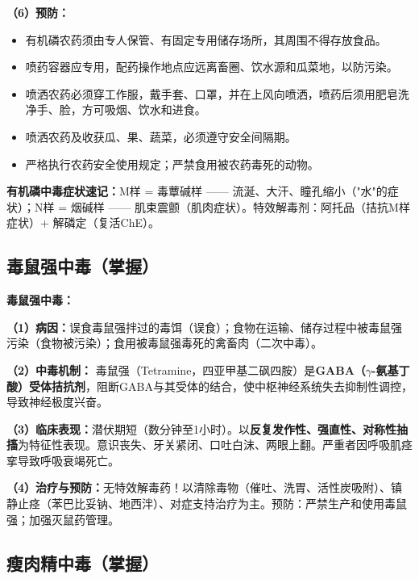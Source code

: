 \begin{keybox}
\textbf{（6）预防：}
\begin{itemize}[leftmargin=*]
    \item 有机磷农药须由专人保管、有固定专用储存场所，其周围不得存放食品。
    \item 喷药容器应专用，配药操作地点应远离畜圈、饮水源和瓜菜地，以防污染。
    \item 喷洒农药必须穿工作服，戴手套、口罩，并在上风向喷洒，喷药后须用肥皂洗净手、脸，方可吸烟、饮水和进食。
    \item 喷洒农药及收获瓜、果、蔬菜，必须遵守安全间隔期。
    \item 严格执行农药安全使用规定；严禁食用被农药毒死的动物。
\end{itemize}
\end{keybox}

\begin{tipbox}
\textbf{有机磷中毒症状速记：}M样 = 毒蕈碱样 —— 流涎、大汗、瞳孔缩小（"水"的症状）；N样 = 烟碱样 —— 肌束震颤（肌肉症状）。特效解毒剂：阿托品（拮抗M样症状）+ 解磷定（复活ChE）。
\end{tipbox}

\subsection{毒鼠强中毒（掌握）}

\begin{keybox}
\textbf{毒鼠强中毒：}

\textbf{（1）病因：}误食毒鼠强拌过的毒饵（误食）；食物在运输、储存过程中被毒鼠强污染（食物被污染）；食用被毒鼠强毒死的禽畜肉（二次中毒）。

\textbf{（2）中毒机制：}\difficulty
毒鼠强（Tetramine，四亚甲基二砜四胺）是\textbf{GABA（$\gamma$-氨基丁酸）受体拮抗剂}，阻断GABA与其受体的结合，使中枢神经系统失去抑制性调控，导致神经极度兴奋。

\textbf{（3）临床表现：}潜伏期短（数分钟至1小时）。以\textbf{反复发作性、强直性、对称性抽搐}为特征性表现。意识丧失、牙关紧闭、口吐白沫、两眼上翻。严重者因呼吸肌痉挛导致呼吸衰竭死亡。

\textbf{（4）治疗与预防：}无特效解毒药！以清除毒物（催吐、洗胃、活性炭吸附）、镇静止痉（苯巴比妥钠、地西泮）、对症支持治疗为主。预防：严禁生产和使用毒鼠强；加强灭鼠药管理。
\end{keybox}

\subsection{瘦肉精中毒（掌握）}

